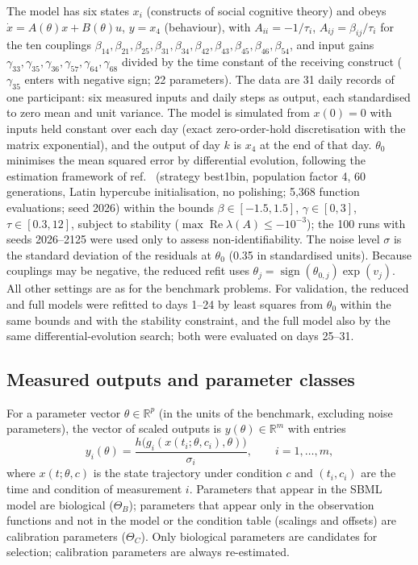 \documentclass[pdflatex,sn-nature]{sn-jnl}
\theoremstyle{plain}
\begin{document}
The model\cite{bib34,bib35} has six states $x_i$ (constructs of social cognitive theory\cite{bib3}) and obeys $\dot x=A(\theta)x+B(\theta)u$, $y=x_4$ (behaviour), with $A_{ii}=-1/\tau_i$, $A_{ij}=\beta_{ij}/\tau_i$ for the ten couplings $\beta_{14},\beta_{21},\beta_{25},\beta_{31},\beta_{34},\beta_{42},\beta_{43},\beta_{45},\beta_{46},\beta_{54}$, and input gains $\gamma_{33},\gamma_{35},\gamma_{36},\gamma_{57},\gamma_{64},\gamma_{68}$ divided by the time constant of the receiving construct ($\gamma_{35}$ enters with negative sign; 22 parameters). The data are 31 daily records of one participant\cite{bib35}: six measured inputs and daily steps as output, each standardised to zero mean and unit variance. The model is simulated from $x(0)=0$ with inputs held constant over each day (exact zero-order-hold discretisation with the matrix exponential), and the output of day $k$ is $x_4$ at the end of that day. $\theta_0$ minimises the mean squared error by differential evolution, following the estimation framework of ref.~\cite{bib35} (strategy best1bin, population factor 4, 60 generations, Latin hypercube initialisation, no polishing; 5,368 function evaluations; seed 2026) within the bounds $\beta\in[-1.5,1.5]$, $\gamma\in[0,3]$, $\tau\in[0.3,12]$, subject to stability ($\max\operatorname{Re}\lambda(A)\le-10^{-3}$); the 100 runs with seeds 2026--2125 were used only to assess non-identifiability. The noise level $\sigma$ is the standard deviation of the residuals at $\theta_0$ (0.35 in standardised units). Because couplings may be negative, the reduced refit uses $\theta_j=\operatorname{sign}(\theta_{0,j})\exp(v_j)$. All other settings are as for the benchmark problems. For validation, the reduced and full models were refitted to days 1--24 by least squares from $\theta_0$ within the same bounds and with the stability constraint, and the full model also by the same differential-evolution search; both were evaluated on days 25--31.

\subsection*{Measured outputs and parameter classes}

For a parameter vector $\theta\in\mathbb{R}^p$ (in the units of the benchmark, excluding noise parameters), the vector of scaled outputs is $y(\theta)\in\mathbb{R}^m$ with entries
\begin{equation}
y_i(\theta)=\frac{h\big(g_i(x(t_i;\theta,c_i),\theta)\big)}{\sigma_i},\qquad i=1,\dots,m,
\label{eq:outputs}
\end{equation}
where $x(t;\theta,c)$ is the state trajectory under condition $c$ and $(t_i,c_i)$ are the time and condition of measurement $i$. Parameters that appear in the SBML model are biological ($\Theta_B$); parameters that appear only in the observation functions and not in the model or the condition table (scalings and offsets) are calibration parameters ($\Theta_C$). Only biological parameters are candidates for selection; calibration parameters are always re-estimated.
\end{document}
